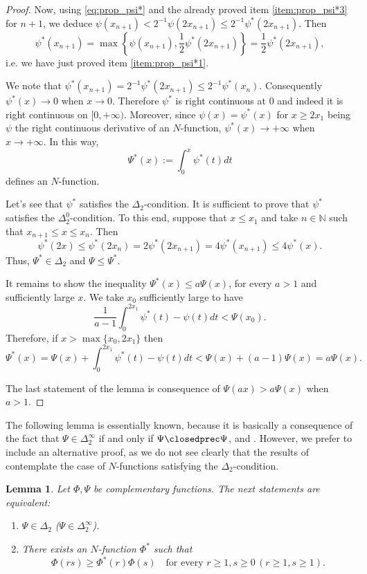 \documentclass[twoside]{elsarticle}
\newtheorem{lem}[thm]{Lemma}
\theoremstyle{remark}
\renewcommand{\leq}{\leqslant}
\renewcommand{\geq}{\geqslant}
\begin{document}
\begin{proof}
Now, using \eqref{eq:prop_psi*} and the already proved item \ref{item:prop_psi*3} for $n+1$, we deduce $\psi(x_{n+1})<2^{-1}\psi(2x_{n+1})\leq 2^{-1}\psi^*(2x_{n+1})$.
Then
\[\psi^*(x_{n+1})=\max\left\{\psi(x_{n+1}),\frac12\psi^*(2x_{n+1}) \right\}=\frac12\psi^*(2x_{n+1}),\]
i.e. we have just proved item \ref{item:prop_psi*1}.

We note that $\psi^*(x_{n+1})=2^{-1}\psi^*(2x_{n+1})\leq 2^{-1}\psi^*(x_{n})$. Consequently $\psi^*(x)\to 0$ when $x\to 0$.
Therefore $\psi^*$ is right continuous at $0$ and indeed it is right continuous on $[0,+\infty)$.
Moreover, since $\psi(x)=\psi^*(x)$ for $x\geq 2x_1$ being $\psi$ the right continuous derivative of an $N$-function, $\psi^*(x)\to +\infty$ when $x\to +\infty$. In this way,
\[\Psi^*(x):=\int_0^x\psi^*(t)dt\]
defines an $N$-function.

Let's see that $\psi^*$ satisfies the $\Delta_2$-condition.
It is sufficient to prove that $\psi^*$ satisfies the $ \Delta_2^0$-condition.
To this end, suppose that  $x\leq x_1$ and take $n\in\mathbb{N}$ such that $x_{n+1}\leq x\leq x_n$. Then
\[\psi^*(2x)\leq \psi^*(2x_n)=2\psi^*(2x_{n+1})=4\psi^*(x_{n+1})\leq 4\psi^*(x).\]
Thus,  $\Psi^* \in  \Delta_2$ and $\Psi\leq \Psi^*$.

It remains to show the inequality $\Psi^*(x)\leq a\Psi(x)$,
for every $a>1$ and sufficiently large $x$. We take $x_0$ sufficiently large to have
\[\frac{1}{a-1}\int_0^{2x_1}\psi^*(t)-\psi(t)dt<\Psi(x_0).\]
Therefore, if  $x>\max\{x_0,2x_1\}$ then
\[\Psi^*(x)=\Psi(x)+\int_0^{2x_1}\psi^*(t)-\psi(t)dt<\Psi(x)+(a-1)\Psi(x)= a\Psi(x).\]

The last statement of the lemma is consequence of   $\Psi(ax)>a\Psi(x)$ when $a>1$.

\end{proof}



The following lemma is essentially known,  because it is basically a consequence  of the fact that $\Psi\in\Delta_2^{\infty}$ if and only if $\Psi\closedprec\Psi$,  \cite[Prop. 4, p. 20]{rao1991theory} and \cite[Cor. 10, p. 30]{rao1991theory}.
However, we prefer to include an alternative proof, as we do not see clearly that the results of \cite{rao1991theory} contemplate the case of  $N$-functions satisfying the $\Delta_2$-condition.



\begin{lem}\label{lem:submultipliativa}
Let $\Phi,\Psi$ be complementary functions.
The next statements are equivalent:
\begin{enumerate}
\item\label{item1} $\Psi \in \Delta_2$ ($\Psi \in \Delta_2^{\infty}$).
\item\label{item2} There exists an $N$-function $\Phi^*$ such that
\begin{equation}\label{eq:caract_delta2}
\Phi(rs)\geq \Phi^*(r)\Phi(s)\quad\mbox{for every }r\geq1,s\geq 0\, (r\geq1,s\geq 1).
\end{equation}
\end{enumerate}
\end{lem}
\end{document}
